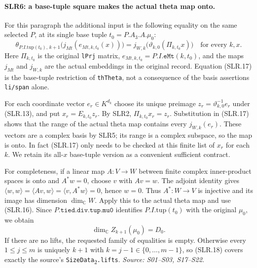 \paragraph{SLR6: a base-tuple square makes the actual theta map onto.}
\label{claim:SLR6}
For this paragraph the additional input is the following equality on
the same selected $P$, at its single base tuple $t_0=P.A_3.A.\mu_0$:
\[
 \theta_{P.I.\mathrm{tup}(t_0),\,k+1}
       \bigl(j_{Mt}(e_{Mt,k,t_0}(x))\bigr)
     =j_{W,k}\bigl(\vartheta_{k,0}(\Pi_{k,t_0}x)\bigr)
       \quad\text{for every }k,x.                       \tag{SLR.17}
\]
Here $\Pi_{k,t_0}$ is the original \texttt{lPrj} matrix,
$e_{Mt,k,t_0}=P.I.\texttt{eMt}(k,t_0)$, and the maps $j_{Mt}$ and
$j_{W,k}$ are the actual embeddings in the original record.  Equation
(SLR.17) is the base-tuple restriction of \texttt{thTheta}, not a
consequence of the basis assertions \texttt{li/span} alone.

For each coordinate vector $e_r\in K^{d_k}$ choose its unique
preimage $z_r=\vartheta_{k,0}^{-1}e_r$ under (SLR.13), and put
$x_r=E_{k,t_0}z_r$.  By SLR2,
$\Pi_{k,t_0}x_r=z_r$.  Substitution in (SLR.17) shows that the range
of the actual theta map contains every $j_{W,k}(e_r)$.  These vectors
are a complex basis by SLR5; its range is a complex subspace, so the
map is onto.  In fact (SLR.17) only needs to be checked at this finite
list of $x_r$ for each $k$.  We retain its all-$x$ base-tuple version
as a convenient sufficient contract.

For completeness, if a linear map $A:V\to W$ between finite
complex inner-product spaces is onto and $A^*w=0$, choose $v$ with
$Av=w$.  The adjoint identity gives
$\langle w,w\rangle=\langle Av,w\rangle
=\langle v,A^*w\rangle=0$, hence $w=0$.
Thus $A^*:W\to V$ is injective and its image has dimension
$\dim_{\mathbb C}W$.  Apply this to the actual theta map and use
(SLR.16).  Since $P.\texttt{tied.div.tup.mu0}$ identifies
$P.I.\mathrm{tup}(t_0)$ with the original $\mu_0$, we obtain
\[
       \dim_{\mathbb C}Z_{k+1}(\mu_0)=D_0.               \tag{SLR.18}
\]
If there are no lifts, the requested family of equalities is empty.
Otherwise every $1\le j\le m$ is uniquely $k+1$ with
$k=j-1\in\{0,\ldots,m-1\}$, so (SLR.18) covers exactly the source's
\texttt{SizeData}\textsubscript{2}\texttt{.lifts}.
\emph{Source: S01--S03, S17--S22.}

